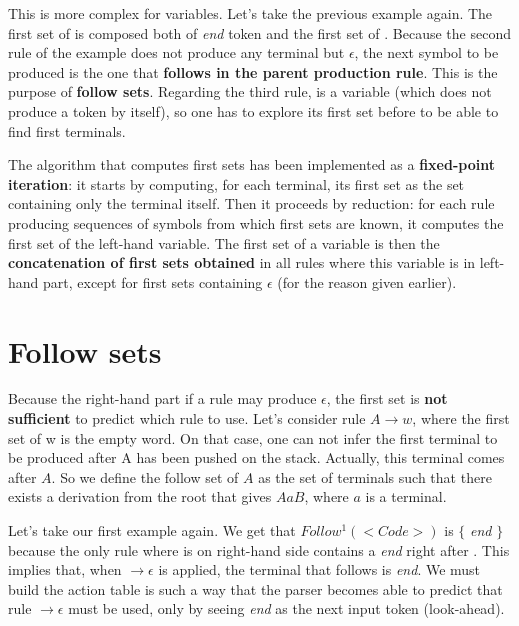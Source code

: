 This is more complex for variables. Let's take the previous example again. The first set of 
is composed both of \textit{end} token and the first set of . Because the second rule of the example
does not produce any terminal but $\epsilon$, the next symbol to be produced is the one that \textbf{follows in the parent production rule}.
This is the purpose of \textbf{follow sets}.
Regarding the third rule,  is a variable (which does not produce a token by itself), so one has to explore its first set
before to be able to find first terminals.

The algorithm that computes first sets has been implemented as a \textbf{fixed-point iteration}: it starts by computing, for each terminal, 
its first set as the set containing only the terminal itself. Then it proceeds by reduction: for each rule producing sequences of symbols
from which first sets are known, it computes the first set of the left-hand variable.
The first set of a variable is then the \textbf{concatenation of first sets obtained} in all rules where this variable is in left-hand part, 
except for first sets containing $\epsilon$ (for the reason given earlier).

\section{Follow sets}

Because the right-hand part if a rule may produce $\epsilon$, the first set is \textbf{not sufficient} to predict which rule to use.
Let's consider rule $A \rightarrow w$, where the first set of w is the empty word. On that case, one can not infer the first terminal
to be produced after A has been pushed on the stack. Actually, this terminal comes after $A$. So we define the follow set of $A$ as
the set of terminals such that there exists a derivation from the root that gives $A a B$, where $a$ is a terminal.

Let's take our first example again. We get that $Follow^1(<Code>)$ is $\{$ \textit{end} $\}$ because the only rule where 
is on right-hand side contains a \textit{end} right after . This implies that, when  $\rightarrow \epsilon$
is applied, the terminal that follows is \textit{end}. We must build the action table is such a way that the parser becomes able to predict
that rule  $\rightarrow \epsilon$ must be used, only by seeing \textit{end} as the next input token (look-ahead).

